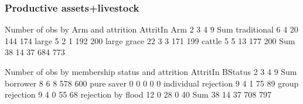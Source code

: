 \subsubsection{Productive assets+livestock}


\begin{Schunk}
\begin{Soutput}


Number of obs by Arm and attrition
             AttritIn
Arm             2   3   4   9 Sum
  traditional   6   4  20 144 174
  large         5   2   1 192 200
  large grace  22   3   3 171 199
  cattle        5   5  13 177 200
  Sum          38  14  37 684 773


Number of obs by membership status and attrition
                      AttritIn
BStatus                  2   3   4   9 Sum
  borrower               8   6   8 578 600
  pure saver             0   0   0   0   0
  individual rejection   9   4   1  75  89
  group rejection        9   4   0  55  68
  rejection by flood    12   0  28   0  40
  Sum                   38  14  37 708 797
\end{Soutput}
\end{Schunk}









